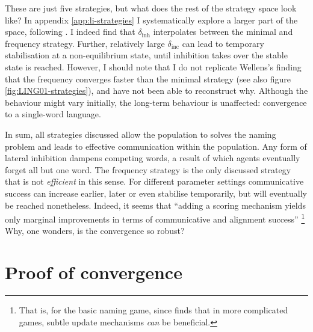 \documentclass{../src/bcthesispart}
\begin{document}
These are just five strategies, but what does the rest of the strategy space look like?
In appendix \ref{app:li-strategies} I systematically explore a larger part of the space, following \textcite{Wellens2012}.
I indeed find that $\delta_{\text{inh}}$ interpolates between the minimal and frequency strategy.
Further, relatively large $\delta_{\text{inc}}$ can lead to temporary stabilisation at a non-equilibrium state, until inhibition takes over the stable state is reached.
However, I should note that I do not replicate Wellens’s finding that the frequency converges faster than the minimal strategy (see also figure \ref{fig:LING01-strategies}), and have not been able to reconstruct why.
Although the behaviour might vary initially, the long-term behaviour is unaffected: convergence to a single-word language.




In sum, all strategies discussed allow the population to solves the naming problem and leads to effective communication within the population.
Any form of lateral inhibition dampens competing words, a result of which agents eventually forget all but one word.
The frequency strategy is the only discussed strategy that is not \emph{efficient} in this sense.
For different parameter settings communicative success can increase earlier, later or even stabilise temporarily, but will eventually be reached nonetheless.
Indeed, it seems that “adding a scoring mechanism yields only marginal improvements in terms of communicative and alignment success” \parencite[23]{Wellens2012}\footnote{%
	That is, for the basic naming game, since \textcite{Wellens2012} finds that in more complicated games, subtle update mechanisms \emph{can} be beneficial.
	}
Why, one wonders, is the convergence so robust? 




\section{Proof of convergence}
\end{document}
